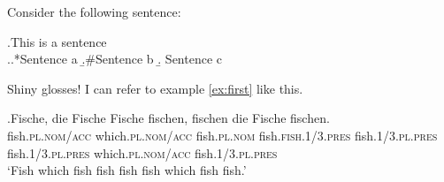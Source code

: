 \documentclass{article}
\title{}
\author{}
\date{}
\begin{document}
Consider the following sentence:

\ex.This is a sentence \label{ex:first}\\

\ex.\a.*Sentence a %
    \b.\#Sentence b
    \b. Sentence c
    
Shiny glosses!  I can refer to example \ref{ex:first} like this. %

\exg.Fische, die Fische Fische fischen, fischen die Fische fischen.\\ %
fish.\textsc{pl.nom/acc} which.\textsc{pl.nom/acc} fish.\textsc{pl.nom} fish.\textsc{fish.1/3.pres} fish.\textsc{1/3.pl.pres} fish.\textsc{1/3.pl.pres} which.\textsc{pl.nom/acc} fish.\textsc{1/3.pl.pres}\\ %
`Fish which fish fish fish fish which fish fish.'
\end{document}
